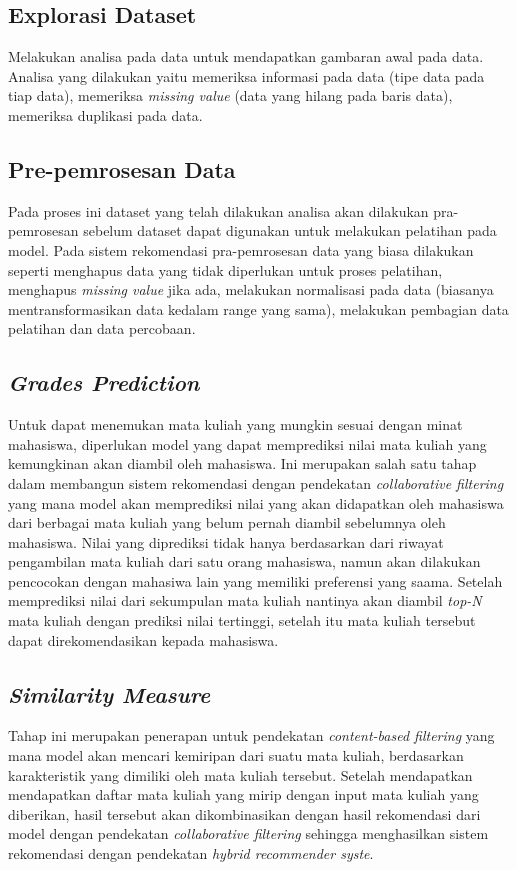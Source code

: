 \begin{adjustwidth}{1em}{0pt}

  \subsection{Explorasi Dataset}
  Melakukan analisa pada data untuk mendapatkan gambaran awal pada data. Analisa yang dilakukan yaitu
  memeriksa informasi pada data (tipe data pada tiap data), memeriksa \emph{missing value} {(data yang hilang pada baris data)},
  memeriksa duplikasi pada data.

  \subsection{Pre-pemrosesan Data}
  Pada proses ini dataset yang telah dilakukan analisa akan dilakukan pra-pemrosesan sebelum dataset dapat digunakan
  untuk melakukan pelatihan pada model. Pada sistem rekomendasi pra-pemrosesan data yang biasa dilakukan seperti menghapus data
  yang tidak diperlukan untuk proses pelatihan, menghapus \emph{missing value} jika ada, melakukan normalisasi pada data (biasanya mentransformasikan data kedalam range yang sama),
  melakukan pembagian data pelatihan dan data percobaan.

  \subsection{\emph{Grades Prediction}}
  Untuk dapat menemukan mata kuliah yang mungkin sesuai dengan minat mahasiswa, diperlukan model yang dapat memprediksi nilai mata kuliah yang kemungkinan akan diambil oleh mahasiswa. Ini
  merupakan salah satu tahap dalam membangun sistem rekomendasi dengan pendekatan \emph{collaborative filtering} yang mana model akan memprediksi nilai yang akan didapatkan oleh mahasiswa dari berbagai mata kuliah
  yang belum pernah diambil sebelumnya oleh mahasiswa. Nilai yang diprediksi tidak hanya berdasarkan dari riwayat pengambilan mata kuliah dari satu orang mahasiswa, namun akan dilakukan pencocokan dengan mahasiwa
  lain yang memiliki preferensi yang saama. Setelah memprediksi nilai dari sekumpulan mata kuliah nantinya akan diambil \emph{top-N} mata kuliah dengan prediksi nilai tertinggi, setelah itu mata kuliah tersebut dapat direkomendasikan
  kepada mahasiswa.

  \subsection{\emph{Similarity Measure}}
  Tahap ini merupakan penerapan untuk pendekatan \emph{content-based filtering} yang mana model akan mencari kemiripan dari suatu mata kuliah, berdasarkan karakteristik yang dimiliki oleh mata kuliah tersebut.
  Setelah mendapatkan mendapatkan daftar mata kuliah yang mirip dengan input mata kuliah yang diberikan, hasil tersebut akan dikombinasikan dengan hasil rekomendasi dari model dengan pendekatan \emph{collaborative filtering}
  sehingga menghasilkan sistem rekomendasi dengan pendekatan \emph{hybrid recommender syste}.


\end{adjustwidth}
